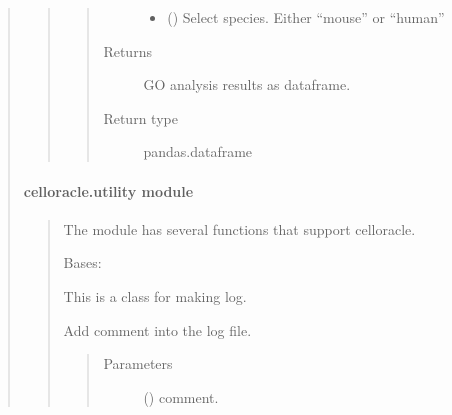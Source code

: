 \documentclass[letterpaper,10pt,english]{sphinxmanual}
\begin{document}
\begin{quote}
\begin{quote}
\begin{fulllineitems}
\begin{quote}
\begin{description}
\begin{itemize}
\item {} 
 () \textendash{} Select species. Either “mouse” or “human”

\end{itemize}

\item[{Returns}] \leavevmode
GO analysis results as dataframe.

\item[{Return type}] \leavevmode
pandas.dataframe

\end{description}\end{quote}

\end{fulllineitems}

\end{quote}


\paragraph{celloracle.utility module}
\label{\detokenize{modules/celloracle.utility:celloracle-utility-module}}\label{\detokenize{modules/celloracle.utility::doc}}\begin{quote}
\label{\detokenize{modules/celloracle.utility:module-celloracle.utility}}
The {\hyperref[\detokenize{modules/celloracle.utility:module-celloracle.utility}]{}} module has several functions that support celloracle.

\begin{fulllineitems}
\label{\detokenize{modules/celloracle.utility:celloracle.utility.makelog}}
Bases: 

This is a class for making log.

\begin{fulllineitems}
\label{\detokenize{modules/celloracle.utility:celloracle.utility.makelog.info}}
Add comment into the log file.
\begin{quote}\begin{description}
\item[{Parameters}] \leavevmode
{} () \textendash{} comment.


\end{description}
\end{quote}
\end{fulllineitems}
\end{fulllineitems}
\end{quote}
\end{quote}
\end{document}
